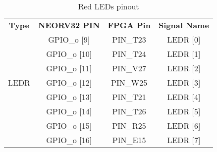 \begin{table}[!htb]\scriptsize
    \centering
    \begin{tabular}{c c c c}
        \toprule[1.5pt]
        \textbf{Type} & \quad \quad \textbf{NEORV32 PIN} & \quad \quad \textbf{FPGA Pin} & \quad \quad \textbf{Signal Name}  \\
        
               & \quad \quad GPIO\_o [9]  & \quad \quad PIN\_T23 & \quad \quad LEDR [0]\\
               & \quad \quad GPIO\_o [10] & \quad \quad PIN\_T24 & \quad \quad LEDR [1]\\
               & \quad \quad GPIO\_o [11] & \quad \quad PIN\_V27 & \quad \quad LEDR [2]\\
        LEDR   & \quad \quad GPIO\_o [12] & \quad \quad PIN\_W25 & \quad \quad LEDR [3]\\        
               & \quad \quad GPIO\_o [13] & \quad \quad PIN\_T21 & \quad \quad LEDR [4]\\
               & \quad \quad GPIO\_o [14] & \quad \quad PIN\_T26 & \quad \quad LEDR [5]\\
               & \quad \quad GPIO\_o [15] & \quad \quad PIN\_R25 & \quad \quad LEDR [6]\\
               & \quad \quad GPIO\_o [16] & \quad \quad PIN\_E15 & \quad \quad LEDR [7]\\

    \end{tabular}
    \caption{\label{tab:ledr_o}Red LEDs pinout}
\end{table}

